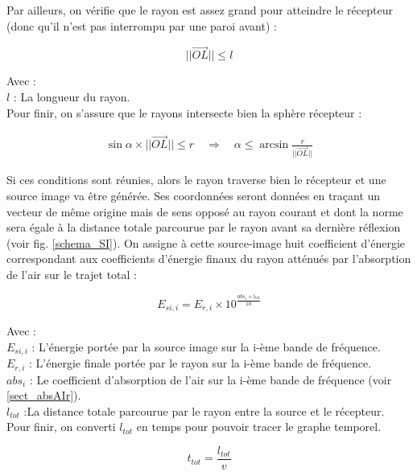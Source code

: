 Par ailleurs, on vérifie que le rayon est assez grand pour atteindre le récepteur (donc qu'il n'est pas interrompu par une paroi avant) :

\begin{equation}
||\overrightarrow{OL}|| \leqslant l
\end{equation}

Avec : \\
$l$ : La longueur du rayon. \\

Pour finir, on s'assure que le rayons intersecte bien la sphère récepteur :

\begin{align}
\sin{\alpha} \times ||\overrightarrow{OL}||  \leqslant r 
\quad \Rightarrow \quad
\alpha  \leqslant \arcsin{\frac{r}{||\overrightarrow{OL}||}}
\end{align}

Si ces conditions sont réunies, alors le rayon traverse bien le récepteur et une source image va être générée. Ses coordonnées seront données en traçant un vecteur de même origine mais de sens opposé au rayon courant et dont la norme sera égale à la distance totale parcourue par le rayon avant sa dernière réflexion (voir fig. \ref{schema_SI}). On assigne à cette source-image huit coefficient d'énergie correspondant aux coefficients d'énergie finaux du rayon atténués par l'absorption de l'air sur le trajet total :

\begin{equation}
E_{si, i} = E_{r, i} \times 10^{\frac{abs_i \times l_{tot} }{10}}
\end{equation}

Avec : \\
$E_{si, i}$ : L'énergie portée par la source image sur la i-ème bande de fréquence. \\
$E_{r, i}$ : L'énergie finale portée par le rayon sur la i-ème bande de fréquence. \\
$abs_i$ : Le coefficient d'absorption de l'air sur la i-ème bande de fréquence (voir \ref{sect_absAIr}). \\
$ l_{tot}$ :La distance totale parcourue par le rayon entre la source et le récepteur. \\

Pour finir, on converti  $l_{tot}$ en temps pour pouvoir tracer le graphe temporel.

\begin{equation}
 t_{tot} =  \frac{l_{tot}}{v}
\end{equation}

